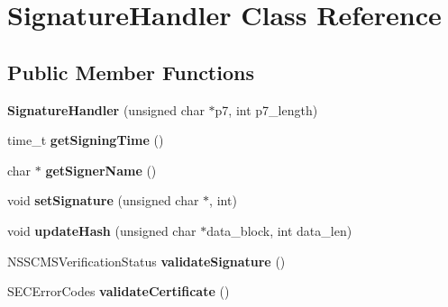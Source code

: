 \hypertarget{class_signature_handler}{}\section{Signature\+Handler Class Reference}
\label{class_signature_handler}
\subsection*{Public Member Functions}
\begin{DoxyCompactItemize}
\item 
\mbox{\label{class_signature_handler_ae38b8ce54abc37bdd4f38b5d302e79c3}} 
{\bfseries Signature\+Handler} (unsigned char $\ast$p7, int p7\+\_\+length)
\item 
\mbox{\label{class_signature_handler_a43cdc5718c8a42ba8389c359a574f132}} 
time\+\_\+t {\bfseries get\+Signing\+Time} ()
\item 
\mbox{\label{class_signature_handler_aed96d5c40bf24e8d88e8cccf4bc79b7d}} 
char $\ast$ {\bfseries get\+Signer\+Name} ()
\item 
\mbox{\label{class_signature_handler_a79fc980b2b7841585c918a487ad87597}} 
void {\bfseries set\+Signature} (unsigned char $\ast$, int)
\item 
\mbox{\label{class_signature_handler_a72a06a06c66081ae5b3a9981eefdd13e}} 
void {\bfseries update\+Hash} (unsigned char $\ast$data\+\_\+block, int data\+\_\+len)
\item 
\mbox{\label{class_signature_handler_ac63372875aee83ae927afc58d964b97f}} 
N\+S\+S\+C\+M\+S\+Verification\+Status {\bfseries validate\+Signature} ()
\item 
\mbox{\label{class_signature_handler_a9e2dd91c842edf612f3d1fcfd0b464fe}} 
S\+E\+C\+Error\+Codes {\bfseries validate\+Certificate} ()
\end{DoxyCompactItemize}
